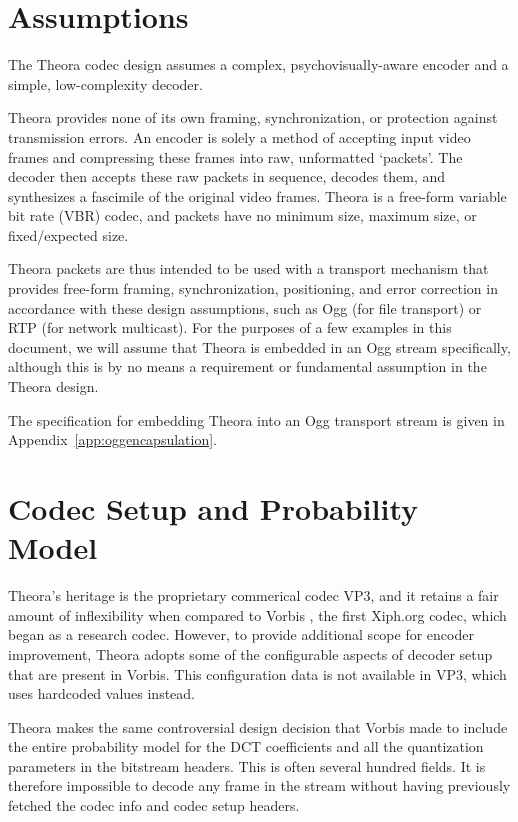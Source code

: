 \documentclass[9pt,letterpaper]{book}
\numberwithin{equation}{chapter}
\numberwithin{figure}{chapter}
\numberwithin{table}{chapter}
\begin{document}
\section{Assumptions}

The Theora codec design assumes a complex, psychovisually-aware encoder and a
 simple, low-complexity decoder.

Theora provides none of its own framing, synchronization, or protection against
 transmission errors. 
An encoder is solely a method of accepting input video frames and
 compressing these frames into raw, unformatted `packets'.
The decoder then accepts these raw packets in sequence, decodes them, and
 synthesizes a fascimile of the original video frames.
Theora is a free-form variable bit rate (VBR) codec, and packets have no
 minimum size, maximum size, or fixed/expected size.

Theora packets are thus intended to be used with a transport mechanism that
 provides free-form framing, synchronization, positioning, and error correction
 in accordance with these design assumptions, such as Ogg (for file transport)
 or RTP (for network multicast).
For the purposes of a few examples in this document, we will assume that Theora
 is embedded in an Ogg stream specifically, although this is by no means a
 requirement or fundamental assumption in the Theora design.

The specification for embedding Theora into an Ogg transport stream is given in
 Appendix~\ref{app:oggencapsulation}.

\section{Codec Setup and Probability Model}

Theora's heritage is the proprietary commerical codec VP3, and it retains a
 fair amount of inflexibility when compared to Vorbis \cite{vorbis}, the first
 Xiph.org codec, which began as a research codec.
However, to provide additional scope for encoder improvement, Theora adopts
 some of the configurable aspects of decoder setup that are present in Vorbis.
This configuration data is not available in VP3, which uses hardcoded values
 instead.

Theora makes the same controversial design decision that Vorbis made to include
 the entire probability model for the DCT coefficients and all the quantization
 parameters in the bitstream headers.
This is often several hundred fields.
It is therefore impossible to decode any frame in the stream without
 having previously fetched the codec info and codec setup headers.
\end{document}
